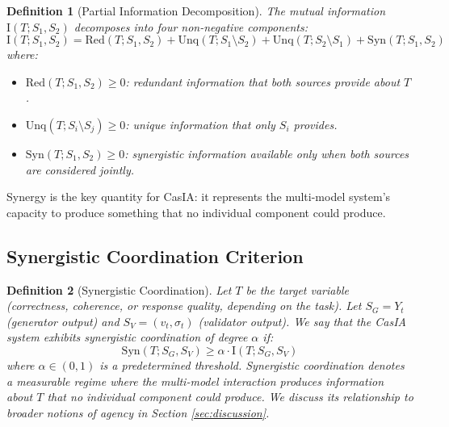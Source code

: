 \documentclass[11pt,a4paper]{article}
\newtheorem{definition}{Definition}[section]
\theoremstyle{remark}
\newcommand{\Syn}{\mathrm{Syn}}
\newcommand{\Red}{\mathrm{Red}}
\newcommand{\Unq}{\mathrm{Unq}}
\newcommand{\MI}{\mathrm{I}}
\begin{document}
\begin{definition}[Partial Information Decomposition]
\label{def:pid}
The mutual information $\MI(T; S_1, S_2)$ decomposes into four non-negative components:
\begin{equation}
\label{eq:pid}
  \MI(T; S_1, S_2) = \Red(T; S_1, S_2) + \Unq(T; S_1 \setminus S_2) + \Unq(T; S_2 \setminus S_1) + \Syn(T; S_1, S_2)
\end{equation}
where:
\begin{itemize}
  \item $\Red(T; S_1, S_2) \geq 0$: \emph{redundant} information that both sources provide about $T$.
  \item $\Unq(T; S_i \setminus S_j) \geq 0$: \emph{unique} information that only $S_i$ provides.
  \item $\Syn(T; S_1, S_2) \geq 0$: \emph{synergistic} information available only when both sources are considered jointly.
\end{itemize}
\end{definition}

Synergy is the key quantity for CasIA: it represents the multi-model system's capacity to produce something that no individual component could produce.

\subsection{Synergistic Coordination Criterion}

\begin{definition}[Synergistic Coordination]
\label{def:agency}
Let $T$ be the target variable (correctness, coherence, or response quality, depending on the task). Let $S_G = Y_t$ (generator output) and $S_V = (v_t, \sigma_t)$ (validator output). We say that the CasIA system exhibits \emph{synergistic coordination} of degree $\alpha$ if:
\begin{equation}
\label{eq:criterion}
  \Syn(T; S_G, S_V) \geq \alpha \cdot \MI(T; S_G, S_V)
\end{equation}
where $\alpha \in (0, 1)$ is a predetermined threshold. Synergistic coordination denotes a measurable regime where the multi-model interaction produces information about $T$ that no individual component could produce. We discuss its relationship to broader notions of agency in Section \ref{sec:discussion}.
\end{definition}
\end{document}
